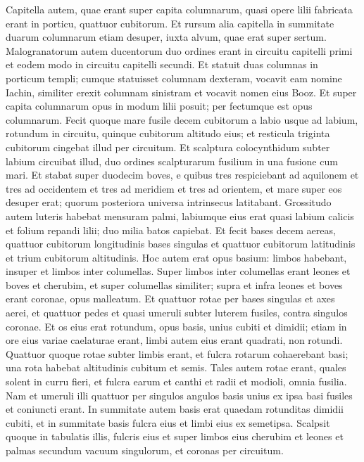 \begin{biblechapter}
\begin{biblechapter}
\begin{biblechapter}
\begin{biblechapter}
\begin{biblechapter}
\begin{biblechapter}
\begin{biblechapter}
\verse Capitella autem, quae erant super capita columnarum, quasi opere lilii fabricata erant in porticu, quattuor cubitorum. 
\verse Et rursum alia capitella in summitate duarum columnarum etiam desuper, iuxta alvum, quae erat super sertum. Malogranatorum autem ducentorum duo ordines erant in circuitu capitelli primi et eodem modo in circuitu capitelli secundi. 
\verse Et statuit duas columnas in porticum templi; cumque statuisset columnam dexteram, vocavit eam nomine Iachin, similiter erexit columnam sinistram et vocavit nomen eius Booz. 
\verse Et super capita columnarum opus in modum lilii posuit; per fectumque est opus columnarum. 
\verse Fecit quoque mare fusile decem cubitorum a labio usque ad labium, rotundum in circuitu, quinque cubitorum altitudo eius; et resticula triginta cubitorum cingebat illud per circuitum. 
\verse Et scalptura colocynthidum subter labium circuibat illud, duo ordines scalpturarum fusilium in una fusione cum mari. 
\verse Et stabat super duodecim boves, e quibus tres respiciebant ad aquilonem et tres ad occidentem et tres ad meridiem et tres ad orientem, et mare super eos desuper erat; quorum posteriora universa intrinsecus latitabant. 
\verse Grossitudo autem luteris habebat mensuram palmi, labiumque eius erat quasi labium calicis et folium repandi lilii; duo milia batos capiebat.
 \verse Et fecit bases decem aereas, quattuor cubitorum longitudinis bases singulas et quattuor cubitorum latitudinis et trium cubitorum altitudinis. 
\verse Hoc autem erat opus basium: limbos habebant, insuper et limbos inter columellas. 
 \verse Super limbos inter columellas erant leones et boves et cherubim, et super columellas similiter; supra et infra leones et boves erant coronae, opus malleatum. 
\verse Et quattuor rotae per bases singulas et axes aerei, et quattuor pedes et quasi umeruli subter luterem fusiles, contra singulos coronae. 
 \verse Et os eius erat rotundum, opus basis, unius cubiti et dimidii; etiam in ore eius variae caelaturae erant, limbi autem eius erant quadrati, non rotundi. 
 \verse Quattuor quoque rotae subter limbis erant, et fulcra rotarum cohaerebant basi; una rota habebat altitudinis cubitum et semis. 
\verse Tales autem rotae erant, quales solent in curru fieri, et fulcra earum et canthi et radii et modioli, omnia fusilia. 
\verse Nam et umeruli illi quattuor per singulos angulos basis unius ex ipsa basi fusiles et coniuncti erant. 
\verse In summitate autem basis erat quaedam rotunditas dimidii cubiti, et in summitate basis fulcra eius et limbi eius ex semetipsa. 
\verse Scalpsit quoque in tabulatis illis, fulcris eius et super limbos eius cherubim et leones et palmas secundum vacuum singulorum, et coronas per circuitum. 

\end{biblechapter}
\end{biblechapter}
\end{biblechapter}
\end{biblechapter}
\end{biblechapter}
\end{biblechapter}
\end{biblechapter}

